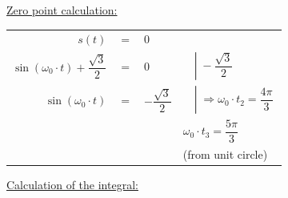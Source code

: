 \begin{enumerate}
	\underline{Zero point calculation:}\\
	\begin{tabularx}{\linewidth}{rlll}
		$s(t)$ & $=$ & $0$ & \\[1.5ex]
		$\sin(\omega_0\cdot{t}) + \dfrac{\sqrt{3}}{2}$ & $=$ & $0$ & $\quad \left|\;- \dfrac{\sqrt{3}}{2}\right. $ \\[1.5ex]
		$\sin(\omega_0\cdot{t})$ & $=$ & $-\dfrac{\sqrt{3}}{2}$    & $\quad \left|\; \Rightarrow \omega_0\cdot{t_2} = \dfrac{4\pi}{3}\;\right.$ \\[1.5ex]
		&&& \phantom{$\quad |\;\Rightarrow$}$\omega_0\cdot{t_3} = \dfrac{5\pi}{3}$  \\[1.5ex]
		&&& \phantom{$\quad |\;\Rightarrow$}(from unit circle) \\[1.5ex]
	\end{tabularx}
	
	\underline{Calculation of the integral:}\\
	
	
	

\end{enumerate}
